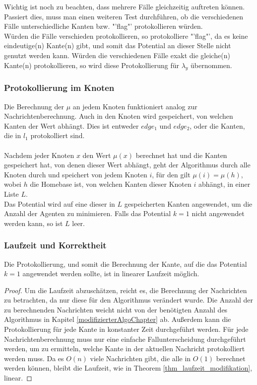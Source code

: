 Wichtig ist noch zu beachten, dass mehrere Fälle gleichzeitig auftreten können. Passiert dies, muss man einen weiteren Test durchführen, ob die verschiedenen Fälle unterschiedliche Kanten bzw. "'flag"' protokollieren würden.
\\
Würden die Fälle verschieden protokollieren, so protokolliere "'flag"', da es keine eindeutige(n) Kante(n) gibt, und somit das Potential an dieser Stelle nicht genutzt werden kann. Würden die verschiedenen Fälle exakt die gleiche(n) Kante(n) protokollieren, so wird diese Protokollierung für $\lambda_{y}$ übernommen.

\subsubsection{Protokollierung im Knoten}

Die Berechnung der $\mu$ an jedem Knoten funktioniert analog zur Nachrichtenberechnung. Auch in den Knoten wird gespeichert, von welchen Kanten der Wert abhängt. Dies ist entweder $edge_{1}$ und $edge_{2}$, oder die Kanten, die in $l_{1}$ protokolliert sind.
\\
\\
Nachdem jeder Knoten $x$ den Wert $\mu(x)$ berechnet hat und die Kanten gespeichert hat, von denen dieser Wert abhängt, geht der Algorithmus durch alle Knoten durch und speichert von jedem Knoten $i$, für den gilt $\mu(i) = \mu(h)$, wobei $h$ die Homebase ist, von welchen Kanten dieser Knoten $i$ abhängt, in einer Liste $L$. \\
Das Potential wird auf eine dieser in $L$ gespeicherten Kanten angewendet, um die Anzahl der Agenten zu minimieren. Falls das Potential $k = 1$ nicht angewendet werden kann, so ist $L$ leer.

\subsubsection{Laufzeit und Korrektheit}


	\begin{theorem}
		Die Protokollierung, und somit die Berechnung der Kante, auf die das Potential $k=1$ angewendet werden sollte, ist in linearer Laufzeit möglich.
	\end{theorem}
	\begin{proof}
		Um die Laufzeit abzuschätzen, reicht es, die Berechnung der Nachrichten zu betrachten, da nur diese für den Algorithmus verändert wurde. Die Anzahl der zu berechnenden Nachrichten weicht nicht von der benötigten Anzahl des Algorithmus in Kapitel \ref{modifizierterAlgoChapter} ab. Außerdem kann die Protokollierung für jede Kante in konstanter Zeit durchgeführt werden. Für jede Nachrichtenberechnung muss nur eine einfache Fallunterscheidung durchgeführt werden, um zu ermitteln, welche Kante in der aktuellen Nachricht protokolliert werden muss. Da es $O(n)$ viele Nachrichten gibt, die alle in $O(1)$ berechnet werden können, bleibt die Laufzeit, wie in Theorem \ref{thm_laufzeit_modifikation}, linear.
	\end{proof}
	
